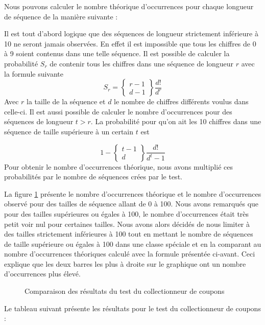 \documentclass[10pt,a4paper]{article}
\begin{document}
Nous pouvons calculer le nombre théorique d'occurrences pour chaque longueur de séquence de la manière suivante :

Il est tout d'abord logique que des séquences de longueur strictement inférieure à 10 ne seront jamais observées. En effet il est impossible que tous les chiffres de 0 à 9 soient contenus dans une telle séquence.
Il est possible de calculer la probabilité $S_r$ de contenir tous les chiffres dans une séquence de longueur $r$ avec la formule suivante
\begin{equation*}
S_r = 
\begin{Bmatrix}
r-1\\
d-1
\end{Bmatrix}
\frac{d!}{d^r}
\end{equation*}
Avec $r$ la taille de la séquence et $d$ le nombre de chiffres différents voulus dans celle-ci.\newline
Il est aussi possible de calculer le nombre d'occurrences pour des séquences de longueur $t>r$. La probabilité pour qu'on ait les 10 chiffres dans une séquence de taille supérieure à un certain $t$ est 

\begin{equation*}
1- 
\begin{Bmatrix}
t-1\\
d
\end{Bmatrix}
\frac{d!}{d^t-1}
\end{equation*}
Pour obtenir le nombre d'occurrences théorique, nous avons multiplié ces probabilités par le nombre de séquences crées par le test.\newline
 
La figure \ref{couponshisto} présente le nombre d'occurrences théorique et le nombre d'occurrences observé pour des tailles de séquence allant de 0 à 100. Nous avons remarqués que pour des tailles supérieures ou égales à 100, le nombre d'occurrences était très petit voir nul pour certaines tailles. Nous avons alors décidés de nous limiter à des tailles strictement inférieures à 100 tout en mettant le nombre de séquences de taille supérieure ou égales à 100 dans une classe spéciale et en la comparant au nombre d'occurrences théoriques calculé avec la formule présentée ci-avant. Ceci explique que les deux barres les plus à droite sur le graphique ont un nombre d'occurrences plus élevé.
\begin{figure}[H]
\caption{Comparaison des résultats du test du collectionneur de coupons}
\label{couponshisto}
\end{figure}
Le tableau suivant présente les résultats pour le test du collectionneur de coupons : 
\end{document}
